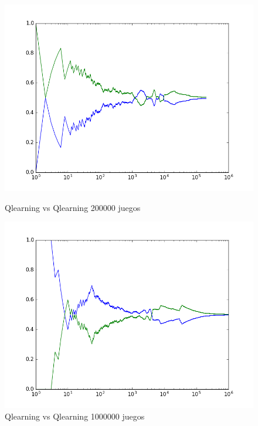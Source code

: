 \begin{figure}[h]
 \centering
 \begin{minipage}{.45\textwidth}
	\centering
	\includegraphics[scale=0.35]{img/QlearningQlearningEgreedy200000.png}
        \caption{Qlearning vs Qlearning 200000 juegos}
  \end{minipage}
 \begin{minipage}{.5\textwidth}
	\centering
	\includegraphics[scale=0.35]{img/QlearningQlearningEgreedy1000000.png}
        \caption{Qlearning vs Qlearning 1000000 juegos}
  \end{minipage}
\end{figure}


